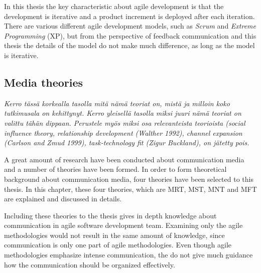 \documentclass[english,12pt,a4paper,pdftex]{article}
\begin{document}
In this thesis the key characteristic about agile development is that the development is iterative and a product increment is deployed after each iteration. There are various different agile development models, such as \emph{Scrum} and \emph{Extreme Programming} (XP), but from the perspective of feedback communication and this thesis the details of the model do not make much difference, as long as the model is iterative.

\subsection{Media theories}

\emph{Kerro tässä korkealla tasolla mitä nämä teoriat on, mistä ja milloin koko tutkimusala on kehittynyt. Kerro yleisellä tasolla miksi juuri nämä teoriat on valittu tähän dippaan. Perustele myös miksi osa relevanteista teorioista (social influence theory, relationship development (Walther 1992), channel expansion (Carlson and Zmud 1999), task-technology fit (Zigur Buckland), on jätetty pois. }

A great amount of research have been conducted about communication media and a number of theories have been formed. In order to form theoretical background about communication media, four theories have been selected to this thesis. In this chapter, these four theories, which are \ac{MRT}, \ac{MST}, \ac{MNT} and \ac{MFT} are explained and discussed in details.

Including these theories to the thesis gives in depth knowledge about communication in agile software development team. Examining only the agile methodologies would not result in the same amount of knowledge, since communication is only one part of agile methodologies. Even though agile methodologies emphasize intense communication, the do not give much guidance how the communication should be organized effectively.
\end{document}
